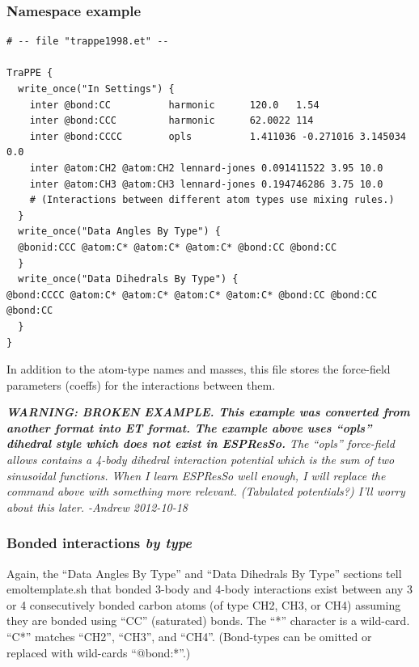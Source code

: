 \documentclass[11pt]{article}
\begin{document}
\pagebreak
\subsubsection{Namespace example}
\label{sec:trappe}
\begin{verbatim}
# -- file "trappe1998.et" --

TraPPE {
  write_once("In Settings") {
    inter @bond:CC          harmonic      120.0   1.54
    inter @bond:CCC         harmonic      62.0022 114
    inter @bond:CCCC        opls          1.411036 -0.271016 3.145034 0.0
    inter @atom:CH2 @atom:CH2 lennard-jones 0.091411522 3.95 10.0
    inter @atom:CH3 @atom:CH3 lennard-jones 0.194746286 3.75 10.0
    # (Interactions between different atom types use mixing rules.)
  }
  write_once("Data Angles By Type") {
  @bonid:CCC @atom:C* @atom:C* @atom:C* @bond:CC @bond:CC
  }
  write_once("Data Dihedrals By Type") {
@bond:CCCC @atom:C* @atom:C* @atom:C* @atom:C* @bond:CC @bond:CC @bond:CC
  }
}
\end{verbatim}
In addition to the atom-type names and masses, 
this file stores the force-field parameters (coeffs) for the 
interactions between them.

\textit{\textbf{WARNING: BROKEN EXAMPLE. 
This example was converted from another format into ET format.
The example above uses ``opls'' dihedral style which
does not exist in ESPResSo.} 
The ``opls'' force-field allows contains a 4-body dihedral interaction
potential which is the sum of two sinusoidal functions.
When I learn ESPResSo well enough, I will replace the command above
with something more relevant.  (Tabulated potentials?)
I'll worry about this later.
-Andrew 2012-10-18}


\subsubsection*{Bonded interactions \textit{by type}}
Again, the ``Data Angles By Type'' and ``Data Dihedrals By Type'' sections 
tell emoltemplate.sh that bonded 3-body and 4-body interactions exist between
any 3 or 4 consecutively bonded carbon atoms (of type CH2, CH3, or CH4)
assuming they are bonded using ``CC'' (saturated) bonds.
The ``*'' character is a wild-card.
``C*'' matches ``CH2'', ``CH3'', and ``CH4''.
(Bond-types can be omitted or replaced with wild-cards ``@bond:*''.)

%
\end{document}
